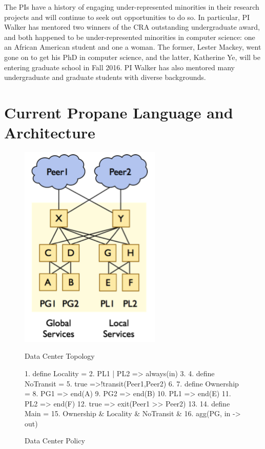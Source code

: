 The PIs have a history of engaging under-represented minorities in
their research projects and will continue to seek out opportunities to
do so.  In particular, PI Walker has mentored two winners of the CRA
outstanding undergraduate award, and both happened to be
under-represented minorities in computer science: one an African
American student and one a woman.  The former, Lester Mackey, went
gone on to get his PhD in computer science, and the latter, Katherine
Ye, will be entering graduate school in Fall 2016.  PI Walker has also mentored
many undergraduate and graduate students with diverse backgrounds.


\section{Current Propane Language and Architecture}
\label{sec:propane}

\begin{figure}[t]
    \centering
    \begin{minipage}{.5\textwidth}
        \centering
        \includegraphics[width=0.6\textwidth]{figures/datacenter-topo}
        \caption{Data Center Topology}
        \label{fig:data-center-topo}
    \end{minipage}%
    \begin{minipage}{0.5\textwidth}
        \centering
\begin{mylisting}
 1. define Locality = 
 2.   {PL1 | PL2 => always(in)}
 3. 
 4. define NoTransit = 
 5.  {true =>!transit({Peer1,Peer2})}
 6.
 7. define Ownership = 
 8.  {PG1   => end(A)
 9.   PG2   => end(B)
10.   PL1   => end(E)
11.   PL2   => end(F)
12.   true => exit(Peer1 >> Peer2)}
13.
14. define Main =
15.   Ownership & Locality & NoTransit & 
16.   agg(PG, in -> out)
\end{mylisting}
        \caption{Data Center Policy}
        \label{fig:policy}
    \end{minipage}
\end{figure}

